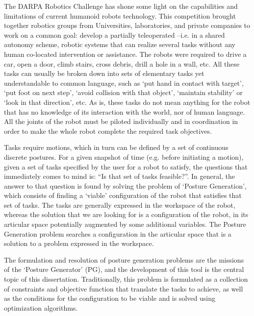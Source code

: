 The DARPA Robotics Challenge has shone some light on the capabilities and limitations of current humanoid robots technology.
This competition brought together robotics groups from Universities, laboratories, and private companies to work on a common goal: develop a partially teleoperated --i.e. in a shared autonomy scheme, robotic systems that can realize several tasks without any human co-located intervention or assistance.
The robots were required to drive a car, open a door, climb stairs, cross debris, drill a hole in a wall, etc.
All these tasks can usually be broken down into sets of elementary tasks yet understandable to common language, such as `put hand in contact with target', `put foot on next step', `avoid collision with that object', `maintain stability' or `look in that direction', etc.
As is, these tasks do not mean anything for the robot that has no knowledge of its interaction with the world, nor of human language.
All the joints of the robot must be piloted individually and in coordination in order to make the whole robot complete the required task objectives.

Tasks require motions, which in turn can be defined by a set of continuous discrete postures. For a given snapshot of time (e.g. before initiating a motion), given a set of tasks specified by the user for a robot to satisfy, the questions that immediately comes to mind is: ``Is that set of tasks feasible?''.
In general, the answer to that question is found by solving the problem of `Posture Generation', which consists of finding a `viable' configuration of the robot that satisfies that set of tasks.
The tasks are generally expressed in the workspace of the robot, whereas the solution that we are looking for is a configuration of the robot, in its articular space potentially augmented by some additional variables. %
The Posture Generation problem searches a configuration in the articular space that is a solution to a problem expressed in the workspace.

The formulation and resolution of posture generation problems are the missions of the `Posture Generator' (PG), and the development of this tool is the central topic of this dissertation.
Traditionally, this problem is formulated as a collection of constraints and objective function that translate the tasks to achieve, as well as the conditions for the configuration to be viable and is solved using optimization algorithms.


